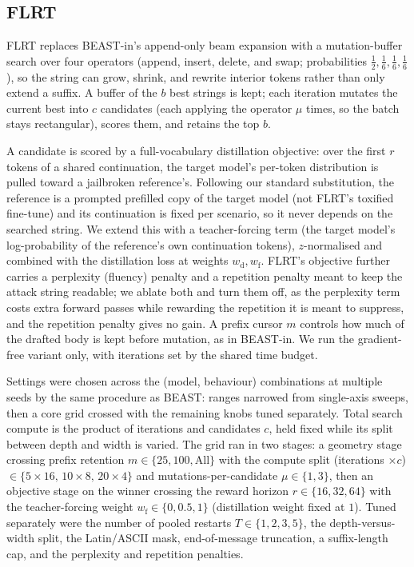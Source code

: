 \documentclass{article}
\begin{document}
\subsection{FLRT}
FLRT \citep{thompson2024flrt} replaces BEAST-in's append-only beam expansion with a mutation-buffer search over four operators (append, insert, delete, and swap; probabilities $\tfrac12, \tfrac16, \tfrac16, \tfrac16$), so the string can grow, shrink, and rewrite interior tokens rather than only extend a suffix. A buffer of the $b$ best strings is kept; each iteration mutates the current best into $c$ candidates (each applying the operator $\mu$ times, so the batch stays rectangular), scores them, and retains the top $b$.

A candidate is scored by a full-vocabulary distillation objective: over the first $r$ tokens of a shared continuation, the target model's per-token distribution is pulled toward a jailbroken reference's. Following our standard substitution, the reference is a prompted prefilled copy of the target model (not FLRT's toxified fine-tune) and its continuation is fixed per scenario, so it never depends on the searched string. We extend this with a teacher-forcing term (the target model's log-probability of the reference's own continuation tokens), $z$-normalised and combined with the distillation loss at weights $w_{\mathrm d}, w_{\mathrm f}$. FLRT's objective further carries a perplexity (fluency) penalty and a repetition penalty meant to keep the attack string readable; we ablate both and turn them off, as the perplexity term costs extra forward passes while rewarding the repetition it is meant to suppress, and the repetition penalty gives no gain. A prefix cursor $m$ controls how much of the drafted body is kept before mutation, as in BEAST-in. We run the gradient-free variant only, with iterations set by the shared time budget.

Settings were chosen across the (model, behaviour) combinations at multiple seeds by the same procedure as BEAST: ranges narrowed from single-axis sweeps, then a core grid crossed with the remaining knobs tuned separately. Total search compute is the product of iterations and candidates $c$, held fixed while its split between depth and width is varied. The grid ran in two stages: a geometry stage crossing prefix retention $m \in \{25, 100, \text{All}\}$ with the compute split (iterations $\times c$) $\in \{5\times16,\,10\times8,\,20\times4\}$ and mutations-per-candidate $\mu \in \{1, 3\}$, then an objective stage on the winner crossing the reward horizon $r \in \{16, 32, 64\}$ with the teacher-forcing weight $w_{\mathrm f} \in \{0, 0.5, 1\}$ (distillation weight fixed at $1$). Tuned separately were the number of pooled restarts $T \in \{1, 2, 3, 5\}$, the depth-versus-width split, the Latin/ASCII mask, end-of-message truncation, a suffix-length cap, and the perplexity and repetition penalties.
\end{document}
